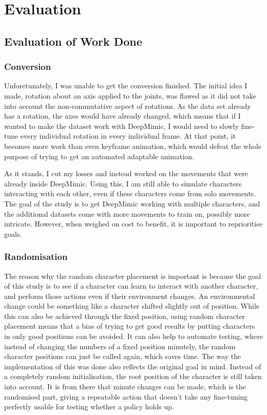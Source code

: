 \documentclass{l4proj}
\begin{document}
\chapter{Evaluation}

\section{Evaluation of Work Done}
\subsection{Conversion}
Unforetunately, I was unable to get the conversion finished. The initial idea I made, rotation about an axis applied to the joints, was flawed as it did not take into account the non-commutative aspect of rotations. As the data set already has a rotation, the axes would have already changed, which means that if I wanted to make the dataset work with DeepMimic, I would need to slowly fine-tune every individual rotation in every individual frame. At that point, it becomes more work than even keyframe animation, which would defeat the whole purpose of trying to get an automated adaptable animation.

As it stands, I cut my losses and instead worked on the movements that were already inside DeepMimic. Using this, I am still able to simulate characters interacting with each other, even if these characters come from solo movements. The goal of the study is to get DeepMimic working with multiple characters, and the additional datasets come with more movements to train on, possibly more intricate. However, when weighed on cost to benefit, it is important to reprioritise goals.

\subsection{Randomisation}
The reason why the random character placement is important is because the goal of this study is to see if a character can learn to interact with another character, and perform those actions even if their environment changes. An environmental change could be something like a character shifted slightly out of position. While this can also be achieved through the fixed position, using random character placement means that a bias of trying to get good results by putting characters in only good positions can be avoided. It can also help to automate testing, where instead of changing the numbers of a fixed position minutely, the random character positions can just be called again, which saves time. The way the implementation of this was done also reflects the original goal in mind. Instead of a completely random initialisation, the root position of the character is still taken into account. It is from there that minute changes can be made, which is the randomised part, giving a repeatable action that doesn't take any fine-tuning perfectly usable for testing whether a policy holds up.
\end{document}
